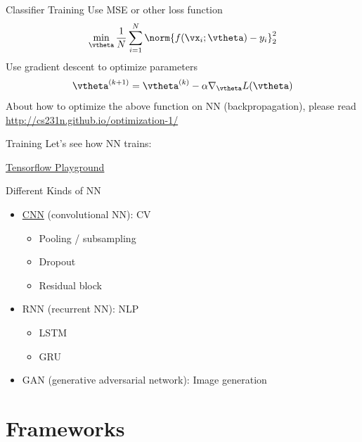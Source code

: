 \documentclass{../TexTemplate/myslide}
\begin{document}
\begin{frame}{Classifier Training}
Use MSE or other loss function
\[\min_{\vtheta} \frac{1}{N}\sum_{i=1}^N\norm{f(\vx_i;\vtheta)-y_i}_2^2\]
Use gradient descent to optimize parameters
\[\vtheta^{(k+1)}=\vtheta^{(k)}-\alpha\nabla_{\vtheta} L(\vtheta)\]
About how to optimize the above function on NN (backpropagation), please read \url{http://cs231n.github.io/optimization-1/}
\end{frame}

\begin{frame}{Training}
Let's see how NN trains:
\begin{flushleft}
\href{https://playground.tensorflow.org/}{Tensorflow Playground}
\end{flushleft}
\end{frame}

\begin{frame}{Different Kinds of NN}
\begin{itemize}
	\item \href{https://ujjwalkarn.me/2016/08/11/intuitive-explanation-convnets/}{CNN} (convolutional NN): CV
	\begin{itemize}
		\item Pooling / subsampling
		\item Dropout
		\item Residual block
	\end{itemize}
	\item RNN (recurrent NN): NLP
	\begin{itemize}
		\item LSTM
		\item GRU
	\end{itemize}
	\item GAN (generative adversarial network): Image generation
\end{itemize}
\end{frame}

\section{Frameworks}
\begin{frame}
\sectionpage
\end{frame}
\end{document}
